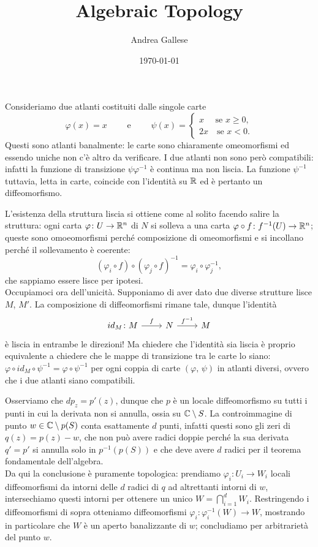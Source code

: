 \documentclass[a4paper]{article}
\title{Algebraic Topology}\let\Title\@title
\author{Andrea Gallese}\let\Author\@author
\date{\today}\let\Date\@date
\begin{document}
	\Intitola

\begin{ex}[1]
	Consideriamo due atlanti costituiti dalle singole carte $$  \varphi(x) = x \qquad\text{ e }\qquad \psi(x) = \begin{cases}
	x \quad \text{ se } x \geq 0, \\
	2x \quad \text{se } x < 0.
	\end{cases}  $$
	Questi sono atlanti banalmente: le carte sono chiaramente omeomorfismi ed essendo uniche non c'è altro da verificare. I due atlanti non sono però compatibili: infatti la funzione di transizione $ \psi \varphi^{-1} $ è continua ma non liscia. La funzione $ \psi^{-1} $ tuttavia, letta in carte, coincide con l'identità su $ \mathbb{R} $ ed è pertanto un diffeomorfismo.
\end{ex}

\begin{ex}[2]
	L'esistenza della struttura liscia si ottiene come al solito facendo salire la struttura: ogni carta $ \varphi\colon U \to \mathbb{R}^n $ di $ N $ si solleva a una carta $ \varphi \circ f \colon f^{-1}(U) \to \mathbb{R}^n $; queste sono omoeomorfismi perché composizione di omeomorfismi e si incollano perché il sollevamento è coerente: $$  (\varphi_i \circ f) \circ (\varphi_j \circ f)^{-1} = \varphi_i \circ \varphi_j^{-1}, $$
	che sappiamo essere lisce per ipotesi. \\
	
	Occupiamoci ora dell'unicità. Supponiamo di aver dato due diverse strutture lisce $ M $, $ M' $. La composizione di diffeomorfismi rimane tale, dunque l'identità
	\[\begin{tikzcd}
	id_M \colon M \rar["f"] & N \rar["f^{-1}"] & M
	\end{tikzcd}  \]
	è liscia in entrambe le direzioni! Ma chiedere che l'identità sia liscia è proprio equivalente a chiedere che le mappe di transizione tra le carte lo siano: $ \varphi \circ id_M \circ \psi^{-1} = \varphi\circ\psi^{-1} $ per ogni coppia di carte $ (\varphi, \, \psi) $ in atlanti diversi, ovvero che i due atlanti siano compatibili.
\end{ex}

\begin{ex}[4]
	Osserviamo che $ dp_z= p'(z) $, dunque che $ p $ è un locale diffeomorfismo su tutti i punti in cui la derivata non si annulla, ossia su $ \mathbb{C} \setminus S $. La controimmagine di punto $ w \in \mathbb{C} \setminus p(S) $ conta esattamente $ d $ punti, infatti questi sono gli zeri di $ q(z) = p(z)-w $, che non può avere radici doppie perché la sua derivata $ q' = p' $ si annulla solo in $ p^{-1}(p(S)) $ e che deve avere $ d $ radici per il teorema fondamentale dell'algebra. \\
	
	Da qui la conclusione è puramente topologica: prendiamo $ \varphi_i\colon U_i \to W_i $ locali diffeomorfismi da intorni delle $ d $ radici di $ q $ ad altrettanti intorni di $ w $, intersechiamo questi intorni per ottenere un unico $ W = \bigcap_{i = 1}^d W_i $. Restringendo i diffeomorfismi di sopra otteniamo diffeomorfismi $ \varphi_i\colon \varphi_i^{-1}(W) \to W $, mostrando in particolare che $ W $ è un aperto banalizzante di $ w $; concludiamo per arbitrarietà del punto $ w $.
\end{ex}
\end{document}
